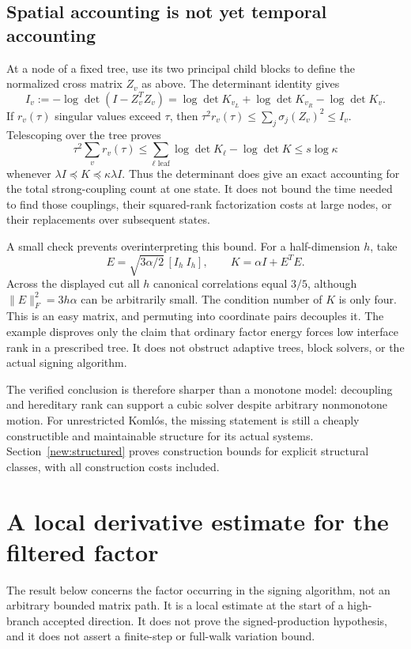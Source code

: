 \documentclass[11pt]{amsart}
\theoremstyle{definition}\newtheorem{definition}[theorem]{Definition}
\theoremstyle{remark}\newtheorem{remark}[theorem]{Remark}
\numberwithin{equation}{section}
\begin{document}
\subsection{Spatial accounting is not yet temporal accounting}
At a node of a fixed tree, use its two principal child blocks to define
the normalized cross matrix $Z_v$ as above. The determinant identity gives
\[
 I_v:=-\log\det(I-Z_v^TZ_v)
   =\log\det K_{v_L}+\log\det K_{v_R}-\log\det K_v.
\]
If $r_v(\tau)$ singular values exceed $\tau$, then
$\tau^2r_v(\tau)\le\sum_j\sigma_j(Z_v)^2\le I_v$.
Telescoping over the tree proves
\begin{equation}\label{ifc:eq:spatial}
 \tau^2\sum_vr_v(\tau)
 \le\sum_{\ell\text{ leaf}}\log\det K_\ell-\log\det K
 \le s\log\kappa
\end{equation}
whenever $\lambda I\preceq K\preceq\kappa\lambda I$.
Thus the determinant does give an exact accounting for the total
strong-coupling count at one state. It does not bound the time needed
to find those couplings, their squared-rank factorization costs at large
nodes, or their replacements over subsequent states.

A small check prevents overinterpreting this bound. For a half-dimension
$h$, take
\[
 E=\sqrt{3\alpha/2}\,[I_h\ I_h],\qquad K=\alpha I+E^TE.
\]
Across the displayed cut all $h$ canonical correlations equal $3/5$,
although $\|E\|_F^2=3h\alpha$ can be arbitrarily small. The condition
number of $K$ is only four. This is an easy matrix, and permuting into
coordinate pairs decouples it. The example disproves only the claim
that ordinary factor energy forces low interface rank in a prescribed
tree. It does not obstruct adaptive trees, block solvers, or the actual
signing algorithm.

The verified conclusion is therefore sharper than a monotone model:
decoupling and hereditary rank can support a cubic solver despite
arbitrary nonmonotone motion. For unrestricted Koml\'os, the missing
statement is still a cheaply constructible and maintainable structure
for its actual systems. Section~\ref{new:structured} proves construction bounds for explicit structural classes, with all construction costs included.


\section{A local derivative estimate for the filtered factor}\label{app:factor}

The result below concerns the factor occurring in the signing algorithm,
not an arbitrary bounded matrix path. It is a local estimate at the start
of a high-branch accepted direction. It does not prove the signed-production
hypothesis, and it does not assert a finite-step or full-walk variation bound.
\end{document}
